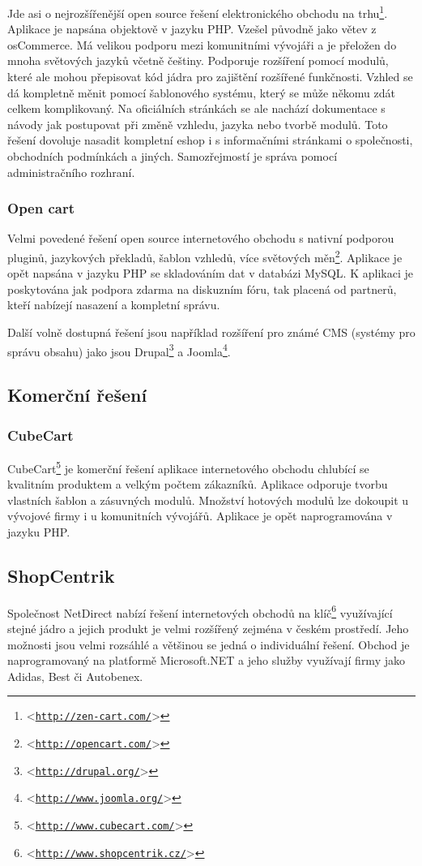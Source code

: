 \documentclass[11pt,twoside,a4paper]{book}
\let\oldUrl\url
\renewcommand\url[1]{<\texttt{\oldUrl{#1}}>}
\begin{document}
Jde asi o nejrozšířenější open source řešení elektronického obchodu na trhu\footnote{\url{http://zen-cart.com/}}. Aplikace je napsána objektově v jazyku PHP. Vzešel původně jako větev z osCommerce. Má velikou podporu mezi komunitními vývojáři a je přeložen do mnoha světových jazyků včetně češtiny. Podporuje rozšíření pomocí modulů, které ale mohou přepisovat kód jádra pro zajištění rozšířené funkčnosti. Vzhled se dá kompletně měnit pomocí šablonového systému, který  se může někomu zdát celkem komplikovaný. Na oficiálních stránkách se ale nachází dokumentace s návody jak postupovat při změně vzhledu, jazyka nebo tvorbě modulů. Toto řešení dovoluje nasadit kompletní eshop i s informačními stránkami o společnosti, obchodních podmínkách a jiných. Samozřejmostí je správa pomocí administračního rozhraní. 

\subsubsection{Open cart}

Velmi povedené řešení open source internetového obchodu s nativní podporou pluginů, jazykových překladů, šablon vzhledů, více světových měn\footnote{\url{http://opencart.com/}}. Aplikace je opět napsána v jazyku PHP se skladováním dat v databázi MySQL. K aplikaci je poskytována jak podpora zdarma na diskuzním fóru, tak placená od partnerů, kteří nabízejí nasazení a kompletní správu.

Další volně dostupná řešení jsou například rozšíření pro známé CMS (systémy pro správu obsahu) jako jsou Drupal\footnote{\url{http://drupal.org/}} a Joomla\footnote{\url{http://www.joomla.org/}}.


\subsection{Komerční řešení}

\subsubsection{CubeCart}

CubeCart\footnote{\url{http://www.cubecart.com/}} je komerční řešení aplikace internetového obchodu chlubící se kvalitním produktem a velkým počtem zákazníků. Aplikace odporuje tvorbu vlastních šablon a zásuvných modulů. Množství hotových modulů lze dokoupit u vývojové firmy i u komunitních vývojářů. Aplikace je opět naprogramována v jazyku PHP.

\subsection{ShopCentrik}
Společnost NetDirect nabízí řešení internetových obchodů na klíč\footnote{\url{http://www.shopcentrik.cz/}} využívající stejné jádro a jejich produkt je velmi rozšířený zejména v českém prostředí. Jeho možnosti jsou velmi rozsáhlé a většinou se jedná o individuální řešení. Obchod je naprogramovaný na platformě Microsoft.NET a jeho služby využívají firmy jako Adidas, Best či Autobenex.
\end{document}
